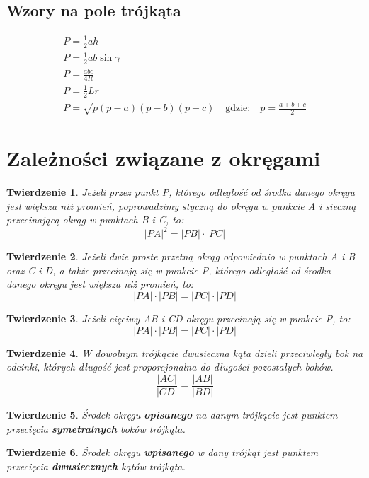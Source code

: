 \documentclass{article}
\numberwithin{equation}{section}
\newtheorem{theorem}{Twierdzenie}[section]
\begin{document}
    \subsection{Wzory na pole trójkąta}
      \begin{gather}
        P = \frac 12ah\\
        P = \frac 12ab\sin\gamma\\
        P = \frac{abc}{4R}\\
        P = \frac 12Lr\\
        P = \sqrt{p(p-a)(p-b)(p-c)}\quad\text{gdzie:}\quad p = \frac{a+b+c}{2}
      \end{gather}

  \section{Zależności związane z okręgami}
    \begin{theorem}
      Jeżeli przez punkt P, którego odległość od środka danego okręgu jest większa niż promień, poprowadzimy styczną do okręgu w punkcie A i sieczną przecinającą okrąg w punktach B i C, to:
      \begin{equation}
        |PA|^2 = |PB| \cdot |PC|
      \end{equation}
    \end{theorem}
    \begin{theorem}
      Jeżeli dwie proste przetną okrąg odpowiednio w punktach A i B oraz C i D, a także przecinają się w punkcie P, którego odległość od środka danego okręgu jest większa niż promień, to:
      \begin{equation}
        |PA| \cdot |PB| = |PC| \cdot |PD|
      \end{equation}
    \end{theorem}
    \begin{theorem}
      Jeżeli cięciwy AB i CD okręgu przecinają się w punkcie P, to:
      \begin{equation}
        |PA| \cdot |PB| = |PC| \cdot |PD|
      \end{equation}
    \end{theorem}
    \begin{theorem}
      W dowolnym trójkącie dwusieczna kąta dzieli przeciwległy bok na odcinki, których długość jest proporcjonalna do długości pozostałych boków.
      \begin{equation}
        \frac{|AC|}{|CD|} = \frac{|AB|}{|BD|}
      \end{equation}
    \end{theorem}
    \begin{theorem}
      Środek okręgu \textbf{opisanego} na danym trójkącie jest punktem przecięcia \textbf{symetralnych} boków trójkąta.
    \end{theorem}
    \begin{theorem}
      Środek okręgu \textbf{wpisanego} w dany trójkąt jest punktem przecięcia \textbf{dwusiecznych} kątów trójkąta.
    \end{theorem}
\end{document}
